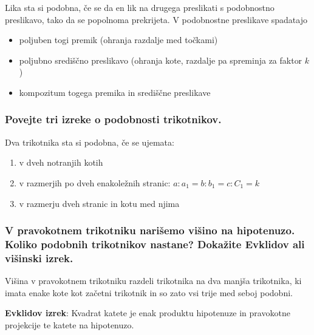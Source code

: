 \documentclass{article}
\begin{document}
Lika sta si podobna, če se da en lik na drugega preslikati s podobnostno preslikavo, tako da se popolnoma prekrijeta.
V podobnostne preslikave spadatajo
\begin{itemize}
    \item poljuben togi premik (ohranja razdalje med točkami)
    \item poljubno središčno preslikavo (ohranja kote, razdalje pa spreminja za faktor $k$)
    \item kompozitum togega premika in središčne preslikave
\end{itemize}

\subsubsection*{Povejte tri izreke o podobnosti trikotnikov.}

Dva trikotnika sta si podobna, če se ujemata:
\begin{enumerate}
    \item v dveh notranjih kotih
    \item v razmerjih po dveh enakoležnih stranic: $a : a_1 = b : b_1 = c : C_1 = k$
    \item v razmerju dveh stranic in kotu med njima 
\end{enumerate}

\subsubsection*{V pravokotnem trikotniku narišemo višino na hipotenuzo. Koliko podobnih trikotnikov nastane? Dokažite Evklidov ali višinski izrek.}

Višina v pravokotnem trikotniku razdeli trikotnika na dva manjša trikotnika, ki imata enake kote kot začetni trikotnik in so zato vsi trije med seboj podobni.

\textbf{Evklidov izrek}: Kvadrat katete je enak produktu hipotenuze in pravokotne projekcije te katete na hipotenuzo. 
\end{document}

